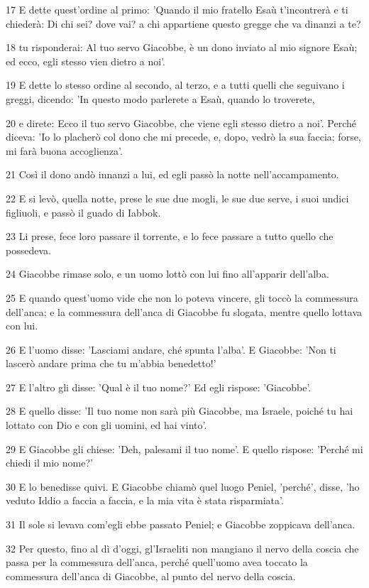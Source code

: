 \par 17 E dette quest'ordine al primo: 'Quando il mio fratello Esaù t'incontrerà e ti chiederà: Di chi sei? dove vai? a chi appartiene questo gregge che va dinanzi a te?
\par 18 tu risponderai: Al tuo servo Giacobbe, è un dono inviato al mio signore Esaù; ed ecco, egli stesso vien dietro a noi'.
\par 19 E dette lo stesso ordine al secondo, al terzo, e a tutti quelli che seguivano i greggi, dicendo: 'In questo modo parlerete a Esaù, quando lo troverete,
\par 20 e direte: Ecco il tuo servo Giacobbe, che viene egli stesso dietro a noi'. Perché diceva: 'Io lo placherò col dono che mi precede, e, dopo, vedrò la sua faccia; forse, mi farà buona accoglienza'.
\par 21 Così il dono andò innanzi a lui, ed egli passò la notte nell'accampamento.
\par 22 E si levò, quella notte, prese le sue due mogli, le sue due serve, i suoi undici figliuoli, e passò il guado di Iabbok.
\par 23 Li prese, fece loro passare il torrente, e lo fece passare a tutto quello che possedeva.
\par 24 Giacobbe rimase solo, e un uomo lottò con lui fino all'apparir dell'alba.
\par 25 E quando quest'uomo vide che non lo poteva vincere, gli toccò la commessura dell'anca; e la commessura dell'anca di Giacobbe fu slogata, mentre quello lottava con lui.
\par 26 E l'uomo disse: 'Lasciami andare, ché spunta l'alba'. E Giacobbe: 'Non ti lascerò andare prima che tu m'abbia benedetto!'
\par 27 E l'altro gli disse: 'Qual è il tuo nome?' Ed egli rispose: 'Giacobbe'.
\par 28 E quello disse: 'Il tuo nome non sarà più Giacobbe, ma Israele, poiché tu hai lottato con Dio e con gli uomini, ed hai vinto'.
\par 29 E Giacobbe gli chiese: 'Deh, palesami il tuo nome'. E quello rispose: 'Perché mi chiedi il mio nome?'
\par 30 E lo benedisse quivi. E Giacobbe chiamò quel luogo Peniel, 'perché', disse, 'ho veduto Iddio a faccia a faccia, e la mia vita è stata risparmiata'.
\par 31 Il sole si levava com'egli ebbe passato Peniel; e Giacobbe zoppicava dell'anca.
\par 32 Per questo, fino al dì d'oggi, gl'Israeliti non mangiano il nervo della coscia che passa per la commessura dell'anca, perché quell'uomo avea toccato la commessura dell'anca di Giacobbe, al punto del nervo della coscia.

